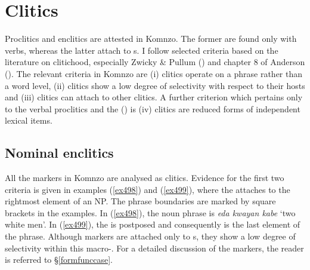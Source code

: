 \section{Clitics} \label{clitics-sec}

Proclitics and enclitics are attested in Komnzo. The former are found only with verbs, whereas the latter attach to s. I follow selected criteria based on the literature on clitichood, especially Zwicky \& Pullum (\citeyear{Zwicky:1983jd}) and chapter 8 of Anderson (\citeyear{Anderson:1992uw}). The relevant criteria in Komnzo are (i) clitics operate on a phrase rather than a word level, (ii) clitics show a low degree of selectivity with respect to their hosts and (iii) clitics can attach to other clitics. A further criterion which pertains only to the verbal proclitics and the ()   is (iv) clitics are reduced forms of independent lexical items.

\subsection{Nominal enclitics}\label{nominal-enclitics-subsec}

All the  markers in Komnzo are analysed as clitics. Evidence for the first two criteria is given in examples (\ref{ex498}) and (\ref{ex499}), where the  attaches to the rightmost element of an NP. The phrase boundaries are marked by square brackets in the examples. In (\ref{ex498}), the noun phrase is \emph{eda kwayan kabe} `two white men'. In (\ref{ex499}), the  is postposed and consequently is the last element of the phrase. Although  markers are attached only to s, they show a low degree of selectivity within this macro-. For a detailed discussion of the  markers, the reader is referred to {\S}\ref{formfunccase}.

